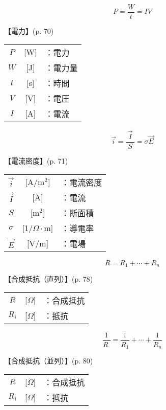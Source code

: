 \documentclass[10pt]{jarticle}
\begin{document}
\newpage
\[
P = \frac{W}{t} = I V
\]


\vskip3mm
【電力】{\footnotesize (p. 70)}

\begin{tabular}{ccl}
$P$	&[W]	&：電力\\
$W$	& [J]	&：電力量\\
$t$	& [s]	&：時間\\
$V$	& [V]	&：電圧\\
$I$	&[A]	&：電流
\end{tabular}


\newpage
\[
\vec{i} = \frac{\vec{I}}{\; S \;} = \sigma \vec{E}
\]


\vskip3mm
【電流密度】{\footnotesize (p. 71)}

\begin{tabular}{ccl}
$\vec{i}$	&[A/m$^2$]	&：電流密度\\
$\vec{I}$	&[A]	&：電流\\
$S$	&[m$^2$]	&：断面積\\
$\sigma$	& [1/$\Omega \cdot$m]	&：導電率\\
$\vec{E}$	& [V/m]	&：電場
\end{tabular}





\newpage
\[
R = R_1 + \cdots + R_n
\]


\vskip3mm
【合成抵抗（直列）】{\footnotesize (p. 78)}

\begin{tabular}{ccl}
$R$	&[$\Omega$]	&：合成抵抗 \\
$R_i$	&[$\Omega$]	&：抵抗 \\
\end{tabular}





\newpage
\[
\frac{1}{R \;} = \frac{1}{R_1} + \cdots + \frac{1}{R_n}
\]


\vskip3mm
【合成抵抗（並列）】{\footnotesize (p. 80)}

\begin{tabular}{ccl}
$R$	&[$\Omega$]	&：合成抵抗 \\
$R_i$	&[$\Omega$]	&：抵抗 \\
\end{tabular}
\end{document}
